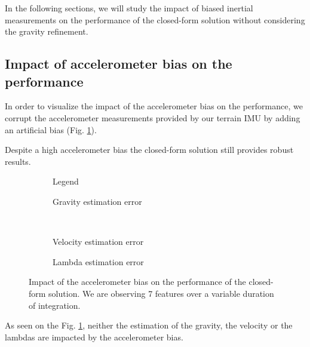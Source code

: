 \documentclass[letterpaper, 10 pt, conference]{ieeeconf}  %
\begin{document}
In the following sections, we will study the impact of biased inertial measurements on the performance of the closed-form solution without considering the gravity refinement.

\subsection{Impact of accelerometer bias on the performance}
In order to visualize the impact of the accelerometer bias on the performance,
we corrupt the accelerometer measurements provided by our terrain IMU by adding an artificial bias (Fig. \ref{fig:biasAccCF}).

Despite a high accelerometer bias the closed-form solution still provides robust results.

\begin{figure}
  \centering
        \hspace{0.2\columnwidth}%
        \begin{subfigure}[b]{0.3\columnwidth}
                \resizebox{\columnwidth}{!}{}
                \caption{Legend}

        \end{subfigure}%
        \begin{subfigure}[b]{0.5\columnwidth}
                \resizebox{\columnwidth}{!}{}
                \caption{Gravity estimation error}

        \end{subfigure}
        ~
        \begin{subfigure}[b]{0.5\columnwidth}
                \resizebox{\columnwidth}{!}{}
                \caption{Velocity estimation error}

        \end{subfigure}%
        \begin{subfigure}[b]{0.5\columnwidth}
                \resizebox{\columnwidth}{!}{}
                \caption{Lambda estimation error}

        \end{subfigure}
        \caption{Impact of the accelerometer bias on the performance of the closed-form solution. We are observing 7 features  over a variable duration of integration.\label{fig:biasAccCF}}
\end{figure}

As seen on the Fig. \ref{fig:biasAccCF}, neither the estimation of the gravity, the velocity or the lambdas are impacted by the accelerometer bias.
\end{document}
